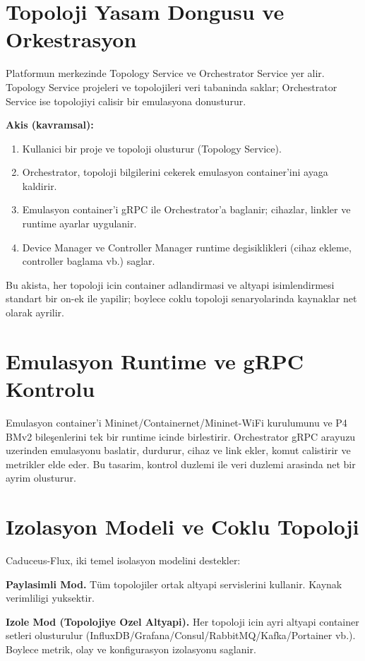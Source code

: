 \documentclass[conference]{IEEEtran}
\begin{document}
\section{Topoloji Yasam Dongusu ve Orkestrasyon}
Platformun merkezinde Topology Service ve Orchestrator Service yer alir. Topology Service projeleri ve topolojileri veri tabaninda saklar; Orchestrator Service ise topolojiyi calisir bir emulasyona donusturur.

\textbf{Akis (kavramsal):}
\begin{enumerate}
\item Kullanici bir proje ve topoloji olusturur (Topology Service).
\item Orchestrator, topoloji bilgilerini cekerek emulasyon container'ini ayaga kaldirir.
\item Emulasyon container'i gRPC ile Orchestrator'a baglanir; cihazlar, linkler ve runtime ayarlar uygulanir.
\item Device Manager ve Controller Manager runtime degisiklikleri (cihaz ekleme, controller baglama vb.) saglar.
\end{enumerate}

Bu akista, her topoloji icin container adlandirmasi ve altyapi isimlendirmesi standart bir on-ek ile yapilir; boylece coklu topoloji senaryolarinda kaynaklar net olarak ayrilir.

\section{Emulasyon Runtime ve gRPC Kontrolu}
Emulasyon container'i Mininet/Containernet/Mininet-WiFi kurulumunu ve P4 BMv2 bileşenlerini tek bir runtime icinde birlestirir. Orchestrator gRPC arayuzu uzerinden emulasyonu baslatir, durdurur, cihaz ve link ekler, komut calistirir ve metrikler elde eder. Bu tasarim, kontrol duzlemi ile veri duzlemi arasinda net bir ayrim olusturur.

\section{Izolasyon Modeli ve Coklu Topoloji}
Caduceus-Flux, iki temel isolasyon modelini destekler:

\textbf{Paylasimli Mod.} Tüm topolojiler ortak altyapi servislerini kullanir. Kaynak verimliligi yuksektir.

\textbf{Izole Mod (Topolojiye Ozel Altyapi).} Her topoloji icin ayri altyapi container setleri olusturulur (InfluxDB/Grafana/Consul/RabbitMQ/Kafka/Portainer vb.). Boylece metrik, olay ve konfigurasyon izolasyonu saglanir.
\end{document}
